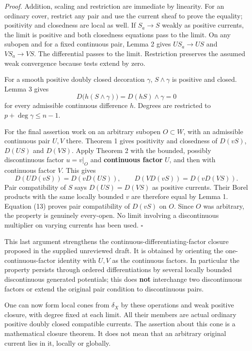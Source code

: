 \documentclass[
  11pt,
]{article}
\begin{document}
\emph{Proof.} Addition, scaling and restriction are immediate by
linearity. For an ordinary cover, restrict any pair and use the current
sheaf to prove the equality; positivity and closedness are local as
well. If \(S_a\to S\) weakly as positive currents, the limit is positive
and both closedness equations pass to the limit. On any subopen and for
a fixed continuous pair, Lemma 2 gives \(US_a\to US\) and
\(VS_a\to VS\). The differential passes to the limit. Restriction
preserves the assumed weak convergence because tests extend by zero.

For a smooth positive doubly closed decoration \(\gamma\),
\(S\wedge\gamma\) is positive and closed. Lemma 3 gives
\[D\bigl(h(S\wedge\gamma)\bigr)=D(hS)\wedge\gamma=0\] for every
admissible continuous difference \(h\). Degrees are restricted to
\(p+\deg\gamma\leq n-1\).

For the final assertion work on an arbitrary subopen \(O\subset W\),
with an admissible continuous pair \(U,V\) there. Theorem 1 gives
positivity and closedness of \(D(vS)\), \(D(US)\) and \(D(VS)\). Apply
Theorem 2 with the bounded, possibly discontinuous factor \(u=v|_O\) and
\textbf{continuous factor} \(U\), and then with continuous factor \(V\).
This gives \[
 D(UD(vS))=D(vD(US)),\qquad
 D(VD(vS))=D(vD(VS)).                                        \tag{13}
\] Pair compatibility of \(S\) says \(D(US)=D(VS)\) as positive
currents. Their Borel products with the same locally bounded \(v\) are
therefore equal by Lemma 1. Equation (13) proves pair compatibility of
\(D(vS)\) on \(O\). Since \(O\) was arbitrary, the property is genuinely
every-open. No limit involving a discontinuous multiplier on varying
currents has been used. \(\square\)

This last argument strengthens the continuous-differentiating-factor
closure proposed in the supplied unreviewed draft. It is obtained by
orienting the one-continuous-factor identity with \(U,V\) as the
continuous factors. In particular the property persists through ordered
differentiations by several locally bounded discontinuous generated
potentials; this does \textbf{not} interchange two discontinuous factors
or extend the original pair condition to discontinuous pairs.

One can now form local cones from \(\delta_X\) by these operations and
weak positive closure, with degree fixed at each limit. All their
members are actual ordinary positive doubly closed compatible currents.
The assertion about this cone is a mathematical closure theorem. It does
not mean that an arbitrary original current lies in it, locally or
globally.
\end{document}
